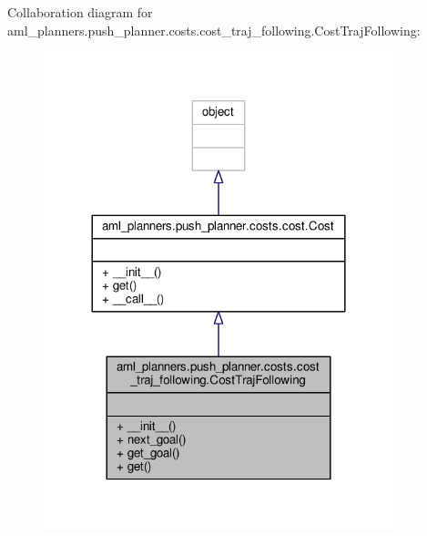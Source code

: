 Collaboration diagram for aml\-\_\-planners.\-push\-\_\-planner.\-costs.\-cost\-\_\-traj\-\_\-following.\-Cost\-Traj\-Following\-:
\nopagebreak
\begin{figure}[H]
\begin{center}
\leavevmode
\includegraphics[width=288pt]{classaml__planners_1_1push__planner_1_1costs_1_1cost__traj__following_1_1_cost_traj_following__coll__graph}
\end{center}
\end{figure}
